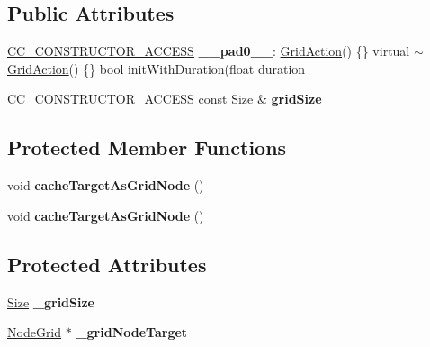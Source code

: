 \subsection*{Public Attributes}
\begin{DoxyCompactItemize}
\item 
\mbox{\label{classGridAction_aa562fcdc85059a6c1ac15bc7688b1d9f}} 
\hyperlink{_2cocos2d_2cocos_2base_2ccConfig_8h_a25ef1314f97c35a2ed3d029b0ead6da0}{C\+C\+\_\+\+C\+O\+N\+S\+T\+R\+U\+C\+T\+O\+R\+\_\+\+A\+C\+C\+E\+SS} {\bfseries \+\_\+\+\_\+pad0\+\_\+\+\_\+}\+: \hyperlink{classGridAction}{Grid\+Action}() \{\} virtual $\sim$\hyperlink{classGridAction}{Grid\+Action}() \{\} bool init\+With\+Duration(float duration
\item 
\mbox{\label{classGridAction_a1172a48119d6060171da38176782440a}} 
\hyperlink{_2cocos2d_2cocos_2base_2ccConfig_8h_a25ef1314f97c35a2ed3d029b0ead6da0}{C\+C\+\_\+\+C\+O\+N\+S\+T\+R\+U\+C\+T\+O\+R\+\_\+\+A\+C\+C\+E\+SS} const \hyperlink{classSize}{Size} \& {\bfseries grid\+Size}
\end{DoxyCompactItemize}
\subsection*{Protected Member Functions}
\begin{DoxyCompactItemize}
\item 
\mbox{\label{classGridAction_a67cfa6b3619a0f5583aed94733b38bcb}} 
void {\bfseries cache\+Target\+As\+Grid\+Node} ()
\item 
\mbox{\label{classGridAction_a67cfa6b3619a0f5583aed94733b38bcb}} 
void {\bfseries cache\+Target\+As\+Grid\+Node} ()
\end{DoxyCompactItemize}
\subsection*{Protected Attributes}
\begin{DoxyCompactItemize}
\item 
\mbox{\label{classGridAction_a98cab42825196ccc37fa71bc82c77d57}} 
\hyperlink{classSize}{Size} {\bfseries \+\_\+grid\+Size}
\item 
\mbox{\label{classGridAction_a3885c38a320a6797439506db733e93be}} 
\hyperlink{classNodeGrid}{Node\+Grid} $\ast$ {\bfseries \+\_\+grid\+Node\+Target}
\end{DoxyCompactItemize}
